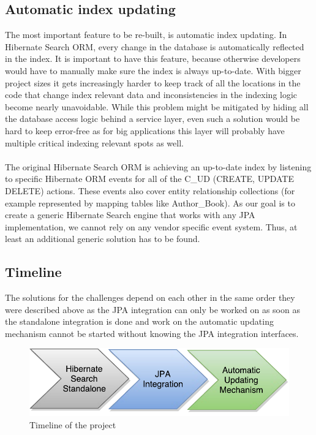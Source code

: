 \subsection{Automatic index updating} \label{automatic_indexing_problematic_intro}
The most important feature to be re-built, is automatic index updating. In Hibernate Search ORM, every change in the database is automatically reflected in the index. It is important to have this feature, because otherwise developers would have to manually make sure the index is always up-to-date. With bigger project sizes it gets increasingly harder to keep track of all the locations in the code that change index relevant data and inconsistencies in the indexing logic become nearly unavoidable. While this problem might be mitigated by hiding all the database access logic behind a service layer, even such a solution would be hard to keep error-free as for big applications this layer will probably have multiple critical indexing relevant spots as well.
\\\\
The original Hibernate Search ORM is achieving an up-to-date index by listening to specific Hibernate ORM events for all of the C\_UD (CREATE, UPDATE DELETE) actions. These events also cover entity relationship collections (for example represented by mapping tables like Author\_Book). As our goal is to create a generic Hibernate Search engine that works with any JPA implementation, we cannot rely on any vendor specific event system. Thus, at least an additional generic solution has to be found.

\subsection{Timeline}
The solutions for the challenges depend on each other in the same order they were described above as the JPA integration can only be worked on as soon as the standalone integration is done and work on the automatic updating mechanism cannot be started without knowing the JPA integration interfaces.
\\
\begin{figure}[ht]
	\centering
	\includegraphics[scale=0.75]{images/timeline_genericjpa_complete.pdf}
	\caption{Timeline of the project}
	\label{project_timeline}
\end{figure}

\pagebreak